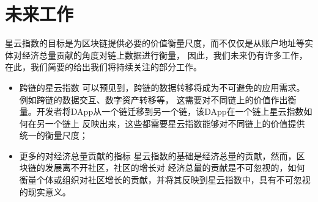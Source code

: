 \section{未来工作}
星云指数的目标是为区块链提供必要的价值衡量尺度，而不仅仅是从账户地址等实体对经济总量贡献的角度对链上数据进行衡量，
因此，我们未来仍有许多工作，在此，我们简要的给出我们将持续关注的部分工作。
\begin{itemize}
\item{跨链的星云指数} 可以预见到，跨链的数据转移将成为不可避免的应用需求。例如跨链的数据交互、数字资产转移等，
这需要对不同链上的价值作出衡量。开发者将DApp从一个链迁移到另一个链，该DApp在一个链上星云指数如何在另一个链上
反映出来，这些都需要星云指数能够对不同链上的价值提供统一的衡量尺度；
\item{更多的对经济总量贡献的指标} 星云指数的基础是经济总量的贡献，然而，区块链的发展离不开社区，社区的增长对
经济总量的贡献是不可忽视的，如何衡量个体或组织对社区增长的贡献，并将其反映到星云指数中，具有不可忽视的现实意义。

\end{itemize}
